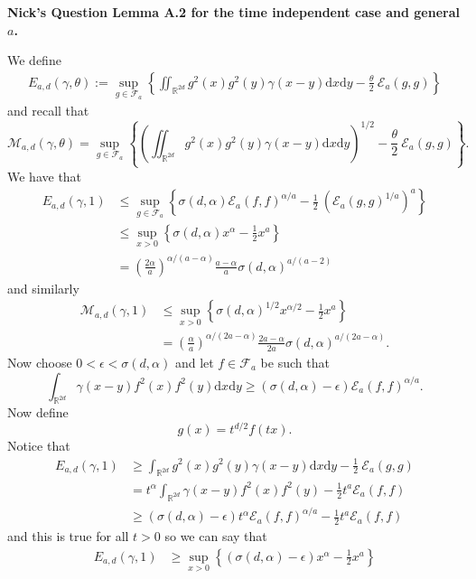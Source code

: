 \documentclass[a4paper,11pt]{article}
\numberwithin{equation}{section}
\theoremstyle{plain}
\theoremstyle{definition}
\newcommand{\ud}{\ensuremath{\mathrm{d} }}
\newcommand{\R}{\mathbb{R}}
\newcounter{NQ}
\newenvironment{NickQuestion}[1][] %
{\refstepcounter{NQ}
	\begin{mdframed}[backgroundcolor=lightgray]\textbf{Nick's Question \theNQ \: #1~~}~~~\noindent}%
	{\end{mdframed}}
\numberwithin{NQ}{section}
\numberwithin{LQ}{section}
\numberwithin{ZQ}{section}
\begin{document}
\begin{NickQuestion}[Lemma A.2 \cite{15AIHP} for the time independent case and general $a$.]

We define
	\begin{align}
		\label{E:VarConstE}
			E_{a,d}(\gamma,\theta) := \sup_{g \in \mathcal{F}_a} \left\{ \iint_{\R^{2d}} g^2(x)g^2(y) \gamma(x-y)\ud x\ud y - \frac{\theta}{2}\: \mathcal{E}_a(g,g) \right\}
	\end{align}
and recall that
	\[
		\mathcal{M}_{a,d}(\gamma,\theta) = \sup_{g \in \mathcal{F}_a} \left\{ \left( \iint_{\R^{2d}} g^2(x)g^2(y) \gamma(x-y)\ud x\ud y \right)^{1/2} - \frac{\theta}{2}\: \mathcal{E}_a(g,g) \right\}.
	\]
We have that
	\begin{align}
		E_{a,d}(\gamma,1) &\le \sup_{g\in \mathcal{F}_a} \left\{ \sigma(d,\alpha) \mathcal{E}_a(f,f)^{\alpha/a} - \frac{1}{2}\: (\mathcal{E}_a(g,g)^{1/a})^a \right\} \nonumber
		\\& \le \sup_{x>0} \left\{ \sigma(d,\alpha) x^\alpha - \frac{1}{2}x^a \right\} \nonumber
		\\& = \left(\frac{2\alpha}{a}\right)^{\alpha/(a-\alpha)}\frac{a-\alpha}{a}\sigma(d,\alpha)^{a/(a-2)} \label{E:Eupperbound}
	\end{align}
and similarly
	\begin{align}
		\mathcal{M}_{a,d}(\gamma,1) & \le \sup_{x > 0} \left\{ \sigma(d,\alpha)^{1/2} x^{\alpha/2} - \frac{1}{2} x^{a} \right\} \nonumber
		\\&= \left( \frac{\alpha}{a}\right)^{\alpha/(2a-\alpha)} \frac{2a-\alpha}{2a}\sigma(d,\alpha)^{a/(2a-\alpha)}. \label{E:Mupperbound}
	\end{align}
Now choose $0 < \epsilon < \sigma(d,\alpha)$ and let $f\in \mathcal{F}_a$ be such that
	\[
		\int_{\R^{2d}} \gamma(x-y)f^2(x)f^2(y) \ud x \ud y \ge (\sigma(d,\alpha)-\epsilon) \mathcal{E}_a(f,f)^{\alpha/a}.
	\]
Now define
	\[
		g(x) = t^{d/2}f(tx).
	\]
Notice that
	\begin{align*}
			E_{a,d}(\gamma,1) &\ge \int_{\R^{2d}} g^2(x)g^2(y) \gamma(x-y)\ud x\ud y - \frac{1}{2}\: \mathcal{E}_a(g,g)
			\\&= t^\alpha \int_{\R^{2d}} \gamma(x-y) f^2(x)f^2(y) - \frac{1}{2} t^a \mathcal{E}_a(f,f)
			\\& \ge (\sigma(d,\alpha)-\epsilon) t^{\alpha} \mathcal{E}_a(f,f)^{\alpha/a} - \frac{1}{2} t^a \mathcal{E}_a(f,f)
	\end{align*}
and this is true for all $t>0$ so we can say that
	\begin{align*}
			E_{a,d}(\gamma,1) &\ge \sup_{x>0} \left\{ (\sigma(d,\alpha)-\epsilon) x^\alpha - \frac{1}{2} x^a \right\} \nonumber

\end{align*}
\end{NickQuestion}
\end{document}
